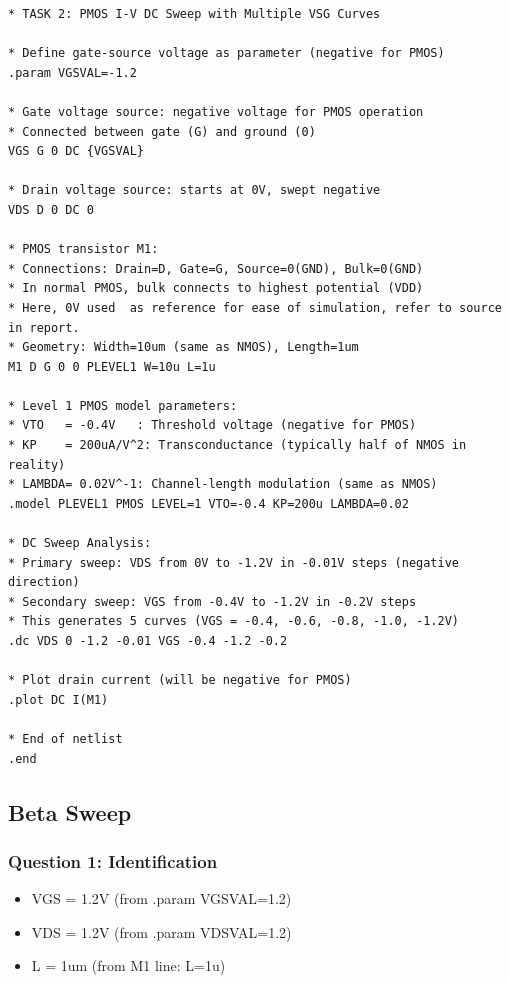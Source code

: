\documentclass[a4paper,12pt]{article}
\begin{document}
\begin{lstlisting}[caption=PMOS Sweep Simulation Code, label=lst:pmos_sweep]
* TASK 2: PMOS I-V DC Sweep with Multiple VSG Curves

* Define gate-source voltage as parameter (negative for PMOS)
.param VGSVAL=-1.2

* Gate voltage source: negative voltage for PMOS operation
* Connected between gate (G) and ground (0)
VGS G 0 DC {VGSVAL}

* Drain voltage source: starts at 0V, swept negative
VDS D 0 DC 0

* PMOS transistor M1:
* Connections: Drain=D, Gate=G, Source=0(GND), Bulk=0(GND)
* In normal PMOS, bulk connects to highest potential (VDD)
* Here, 0V used  as reference for ease of simulation, refer to source in report.
* Geometry: Width=10um (same as NMOS), Length=1um
M1 D G 0 0 PLEVEL1 W=10u L=1u

* Level 1 PMOS model parameters:
* VTO   = -0.4V   : Threshold voltage (negative for PMOS)
* KP    = 200uA/V^2: Transconductance (typically half of NMOS in reality)
* LAMBDA= 0.02V^-1: Channel-length modulation (same as NMOS)
.model PLEVEL1 PMOS LEVEL=1 VTO=-0.4 KP=200u LAMBDA=0.02

* DC Sweep Analysis:
* Primary sweep: VDS from 0V to -1.2V in -0.01V steps (negative direction)
* Secondary sweep: VGS from -0.4V to -1.2V in -0.2V steps
* This generates 5 curves (VGS = -0.4, -0.6, -0.8, -1.0, -1.2V)
.dc VDS 0 -1.2 -0.01 VGS -0.4 -1.2 -0.2

* Plot drain current (will be negative for PMOS)
.plot DC I(M1)

* End of netlist
.end
\end{lstlisting}

\subsection{Beta Sweep}

\subsubsection{Question 1: Identification}

\begin{itemize}
    \item VGS = 1.2V (from .param VGSVAL=1.2)
    \item VDS = 1.2V (from .param VDSVAL=1.2)
    \item L = 1um (from M1 line: L=1u)
\end{itemize}
\end{document}

